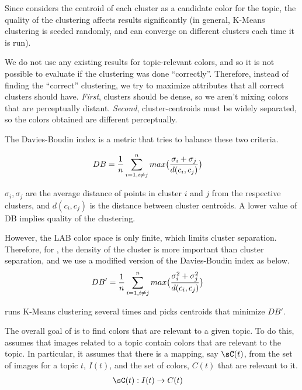 Since \system considers the centroid of each cluster as a candidate color for the topic, the quality of the clustering affects results significantly (in general, K-Means clustering is seeded randomly, and can converge on different clusters each time it is run).

We do not use any existing results for topic-relevant colors, and so it is not possible to evaluate if the clustering was done ``correctly''. Therefore, instead of finding the ``correct'' clustering, we try to maximize attributes that all correct clusters should have. {\em First}, clusters should be dense, so we aren't mixing colors that are perceptually distant. {\em Second}, cluster-centroids must be widely separated, so the colors obtained are different perceptually.

The Davies-Boudin index is a metric that tries to balance these two criteria. 

\begin{align}
DB &= \frac{1}{n} \sum_{i=1, i \neq j}^{n}max\big{(}\frac{\sigma_{i} + \sigma_{j}}{d(c_{i}, c_{j})}\big{)}
\end{align}

$\sigma_{i}, \sigma_{j}$ are the average distance of points in cluster $i$ and $j$ from the respective clusters, and $d(c_{i}, c_{j})$ is the distance between cluster centroids. A lower value of DB implies quality of the clustering.

However, the LAB color space is only finite, which limits cluster separation. Therefore, for \system, the density of the cluster is more important than cluster separation, and we use a modified version of the Davies-Boudin index as below.
\begin{align}
DB' &= \frac{1}{n} \sum_{i=1, i \neq j}^{n}max\big{(}\frac{\sigma_{i}^{2} + \sigma_{j}^{2}}{d(c_{i}, c_{j})}\big{)}
\end{align}

\system runs K-Means clustering several times and picks centroids that minimize $DB'$. 

The overall goal of \system is to find colors that are relevant to a given topic. To do this, \system assumes that images related to a topic contain colors that are relevant to the topic. In particular, it assumes that there is a mapping, say $\sC(t)$, from the set of images for a topic $t$, $I(t)$, and the set of colors, $C(t)$ that are relevant to it. 
\begin{align*}
\sC(t) : I(t) &\rightarrow C(t)
\end{align*} 

